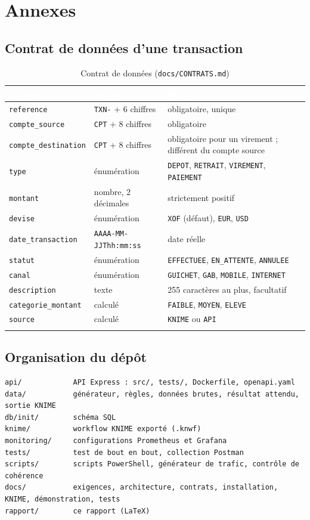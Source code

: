 \chapter{Annexes}

\section{Contrat de données d'une transaction}
\small
\begin{longtable}{|p{3.9cm}|p{3.6cm}|p{7.2cm}|}
\hline
\rowcolor{bluedark}\textcolor{white}{\textbf{Champ}} & \textcolor{white}{\textbf{Format}} & \textcolor{white}{\textbf{Règle}} \\
\hline
\endhead
\texttt{reference} & \texttt{TXN-} + 6 chiffres & obligatoire, unique \\
\hline
\texttt{compte\_source} & \texttt{CPT} + 8 chiffres & obligatoire \\
\hline
\texttt{compte\_destination} & \texttt{CPT} + 8 chiffres & obligatoire pour un virement ; différent du compte source \\
\hline
\texttt{type} & énumération & \texttt{DEPOT}, \texttt{RETRAIT}, \texttt{VIREMENT}, \texttt{PAIEMENT} \\
\hline
\texttt{montant} & nombre, 2 décimales & strictement positif \\
\hline
\texttt{devise} & énumération & \texttt{XOF} (défaut), \texttt{EUR}, \texttt{USD} \\
\hline
\texttt{date\_transaction} & \texttt{AAAA-MM-JJThh:mm:ss} & date réelle \\
\hline
\texttt{statut} & énumération & \texttt{EFFECTUEE}, \texttt{EN\_ATTENTE}, \texttt{ANNULEE} \\
\hline
\texttt{canal} & énumération & \texttt{GUICHET}, \texttt{GAB}, \texttt{MOBILE}, \texttt{INTERNET} \\
\hline
\texttt{description} & texte & 255 caractères au plus, facultatif \\
\hline
\texttt{categorie\_montant} & calculé & \texttt{FAIBLE}, \texttt{MOYEN}, \texttt{ELEVE} \\
\hline
\texttt{source} & calculé & \texttt{KNIME} ou \texttt{API} \\
\hline
\caption{Contrat de données (\texttt{docs/CONTRATS.md})}
\end{longtable}

\section{Organisation du dépôt}
\begin{lstlisting}
api/            API Express : src/, tests/, Dockerfile, openapi.yaml
data/           générateur, règles, données brutes, résultat attendu, sortie KNIME
db/init/        schéma SQL
knime/          workflow KNIME exporté (.knwf)
monitoring/     configurations Prometheus et Grafana
tests/          test de bout en bout, collection Postman
scripts/        scripts PowerShell, générateur de trafic, contrôle de cohérence
docs/           exigences, architecture, contrats, installation, KNIME, démonstration, tests
rapport/        ce rapport (LaTeX)
\end{lstlisting}
